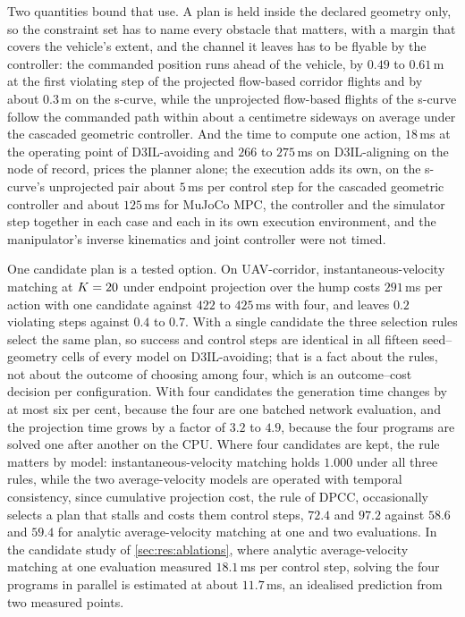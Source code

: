 Two quantities bound that use. A plan is held inside the declared geometry only, so the constraint set
has to name every obstacle that matters, with a margin that covers the vehicle's extent, and the
channel it leaves has to be flyable by the controller: the commanded position runs ahead of the
vehicle, by $0.49$ to $0.61$\,m at the first violating step of the projected flow-based corridor
flights and by about $0.3$\,m on the s-curve, while the unprojected flow-based flights of the s-curve
follow the commanded path within about a centimetre sideways on average under the cascaded geometric
controller. And the time to compute one action, $18$\,ms at
the operating point of D3IL-avoiding and $266$ to $275$\,ms on D3IL-aligning on the node of record,
prices the planner alone; the execution adds its own, on the s-curve's unprojected pair about
$5$\,ms per control step for the cascaded geometric controller and about $125$\,ms for MuJoCo MPC,
the controller and the simulator step together in each case and each in its own execution
environment, and the manipulator's inverse kinematics and joint controller were not timed. 

One candidate plan is a tested option. On UAV-corridor, instantaneous-velocity matching at $K = 20$
under endpoint projection over the hump costs $291$\,ms per action with one candidate against $422$
to $425$\,ms with four, and leaves $0.2$ violating steps against $0.4$ to $0.7$. With a single
candidate the three selection rules select the same plan, so success and control steps are identical
in all fifteen seed--geometry cells of every model on D3IL-avoiding; that is a fact about the rules,
not about the outcome of choosing among four, which is an outcome--cost decision per configuration.
With four candidates the generation time changes by at most six per cent, because the four are one
batched network evaluation, and the projection time grows by a factor of $3.2$ to $4.9$, because the
four programs are solved one after another on the CPU. Where four candidates are kept, the rule
matters by model: instantaneous-velocity matching holds $1.000$ under all three rules, while the two
average-velocity models are operated with temporal consistency, since cumulative projection cost, the
rule of \ac{DPCC}, occasionally selects a plan that stalls and costs them control steps, $72.4$ and
$97.2$ against $58.6$ and $59.4$ for analytic average-velocity matching at one and two evaluations.
In the candidate study of \autoref{sec:res:ablations}, where analytic average-velocity matching at one
evaluation measured $18.1$\,ms per control step, solving the four programs in parallel is estimated
at about $11.7$\,ms, an idealised prediction from two measured points.


